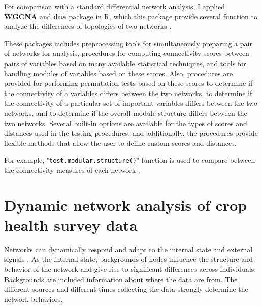 For comparison with a standard differential network analysis, I applied \textbf{WGCNA}  and \textbf{dna}  package in R, which this package provide several function to analyze the differences of topologies of two networks . 


These packages includes preprocessing tools for simultaneously preparing a pair of networks for analysis, procedures for computing connectivity scores between pairs of variables based on many available statistical techniques, and tools for handling modules of variables based on these scores. Also, procedures are provided for performing permutation tests based on these scores to determine if the connectivity of a variables differs between the two networks, to determine if the connectivity of a particular set of important variables differs between the two networks, and to determine if the overall module structure differs between the two networks. Several built-in options are available for the types of scores and distances used in the testing procedures, and additionally, the procedures provide flexible methods that allow the user to define custom scores and distances.

For example, "\texttt{test.modular.structure()}" function is used to compare between the connectivity measures of each network . 



 

\section*{Dynamic network analysis of crop health survey data}
Networks can dynamically respond and adapt to the internal state and external signals . As the internal state, backgrounds of nodes influence the structure and behavior of the network and give rise to significant differences across individuals. Backgrounds are included information about where the data are from. The different sources and different times collecting the data strongly determine the network behaviors. 

